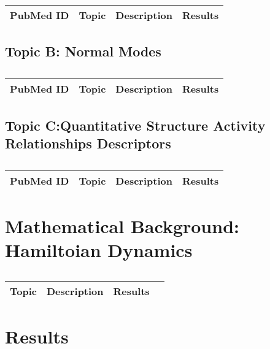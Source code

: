 \centering	
\begin{table}[H]\tiny
	\caption{}	
	\begin{tabular}{p{1cm}p{1cm}|p{4cm}|l}
		\hline	
		PubMed ID & Topic & Description & Results \\
		\hline 
		\hline 
	\end{tabular}
\end{table}

\subsection{Topic B: Normal Modes}

\centering	
\begin{table}[H]\tiny
	\caption{}	
	\begin{tabular}{p{1cm}p{1cm}|p{4cm}|l}
		\hline	
		PubMed ID & Topic & Description & Results \\
		\hline 
		\hline 
	\end{tabular}
\end{table}

\subsection{Topic C:Quantitative Structure Activity Relationships Descriptors}

\centering	
\begin{table}[H]\tiny
	\caption{}	
	\begin{tabular}{p{1cm}p{1cm}|p{4cm}|l}
		\hline	
		PubMed ID & Topic & Description & Results \\
		\hline 
		\hline 
	\end{tabular}
\end{table}


\section{Mathematical Background: Hamiltoian Dynamics}

\centering	
\begin{table}[H]\tiny
	\caption{}	
	\begin{tabular}{p{1cm}p{1cm}|p{4cm}|l}
		\hline	
		Topic & Description & Results \\
		\hline 
		\hline 
	\end{tabular}
\end{table}

\section{Results}


